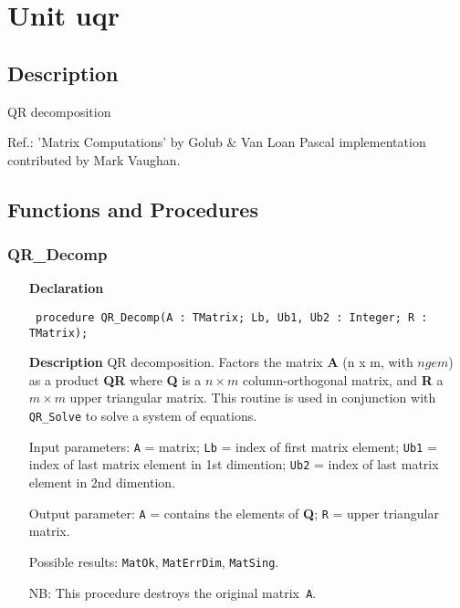 \documentclass[12pt,a4paper,oneside]{report}
\newcommand{\declarationitem}[1]{\textbf{#1}}
\newcommand{\descriptiontitle}[1]{\textbf{#1}}
\newcommand{\code}[1]{\texttt{#1}}
\begin{document}
\section{Unit uqr}
\label{uqr}
\subsection{Description}
QR decomposition

Ref.: 'Matrix Computations' by Golub {\&} Van Loan Pascal implementation contributed by Mark Vaughan. 
\subsection{Functions and Procedures}
\subsubsection{QR{\_}Decomp}
\label{uqr-QR_Decomp}
\begin{itemize}\item[\declarationitem{Declaration}\hfill]
	\begin{flushleft}
		\code{
			procedure QR{\_}Decomp(A : TMatrix; Lb, Ub1, Ub2 : Integer; R : TMatrix);}
		
	\end{flushleft}
	
	\par
	\item[\descriptiontitle{Description}]
	QR decomposition. Factors the matrix \textbf{A} (n x m, with $n ge m$) as a product \textbf{QR} where \textbf{Q} is a $n \times m$ column{-}orthogonal matrix, and \textbf{R} a $m \times m$ upper triangular matrix. This routine is used in conjunction with \code{QR{\_}Solve} to solve a system of equations.
	
	Input parameters: \code{A} = matrix; \code{Lb} = index of first matrix element; \code{Ub1} = index of last matrix element in 1st dimention; \code{Ub2} = index of last matrix element in 2nd dimention.
	
	Output parameter: \code{A} = contains the elements of \textbf{Q}; \code{R} = upper triangular matrix.
	
	Possible results: \code{MatOk}, \code{MatErrDim}, \code{MatSing}.
	
	NB: This procedure destroys the original matrix\code{ A}.
	
\end{itemize}
\end{document}
